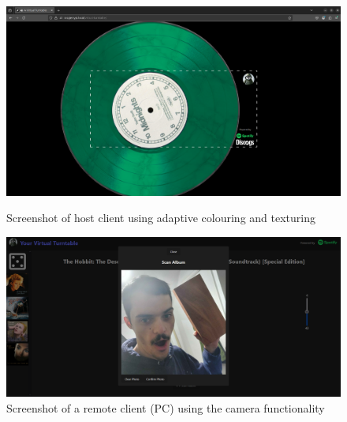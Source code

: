\begin{uomappendix}
\begin{figure}[H]
                \begin{minipage}[b]{0.45\textwidth}
                    \centering
                    \includegraphics[width=\textwidth]{images/screenshots/HOST_Green.png}
                    \caption{Screenshot of host client using adaptive colouring and texturing}
                    \label{fig:hostGreen}
                \end{minipage}
                \hfill
                \begin{minipage}[b]{0.45\textwidth}
                    \centering
                    \includegraphics[width=\textwidth]{images/screenshots/LAPTOP_Cam.png}
                    \caption{Screenshot of a remote client (PC) using the camera functionality}
                    \label{fig:laptopCam}
                \end{minipage}
                
                \vspace{0.5cm}
                

\end{figure}
\end{uomappendix}
